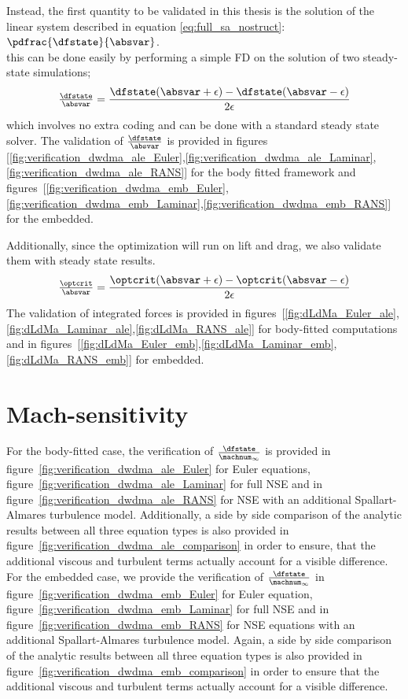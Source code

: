 \documentclass[../main.tex]{subfiles}
\begin{document}
Instead, the first quantity to be validated in this thesis is the solution of the linear system described in equation \eqref{eq:full_sa_nostruct}: $\pdfrac{\dfstate}{\absvar}$.\\
this can be done easily by performing a simple \ac{FD} on the solution of two steady-state simulations;
\begin{align}
\tfrac{\dfstate}{\absvar}=\frac{\dfstate(\absvar+\epsilon)-\dfstate(\absvar-\epsilon)}{2 \epsilon}
\end{align}
which involves no extra coding and can be done with a standard steady state solver.
The validation of $\tfrac{\dfstate}{\absvar}$ is provided in figures [\ref{fig:verification_dwdma_ale_Euler},\ref{fig:verification_dwdma_ale_Laminar},\ref{fig:verification_dwdma_ale_RANS}] for the body fitted framework and figures~[\ref{fig:verification_dwdma_emb_Euler},\ref{fig:verification_dwdma_emb_Laminar},\ref{fig:verification_dwdma_emb_RANS}] for the embedded.

Additionally, since the optimization will run on lift and drag, we also validate them with steady state results.
\begin{align}
\tfrac{\optcrit}{\absvar}=\frac{\optcrit(\absvar+\epsilon)-\optcrit(\absvar-\epsilon)}{2 \epsilon}
\end{align}
The validation of integrated forces is provided in figures~[\ref{fig:dLdMa_Euler_ale},\ref{fig:dLdMa_Laminar_ale},\ref{fig:dLdMa_RANS_ale}] for body-fitted computations and in figures~[\ref{fig:dLdMa_Euler_emb},\ref{fig:dLdMa_Laminar_emb},\ref{fig:dLdMa_RANS_emb}] for embedded.



\section{Mach-sensitivity}
For the body-fitted case, the verification of $\tfrac{\dfstate}{\machnum_{\infty}}$ is provided in figure~\ref{fig:verification_dwdma_ale_Euler} for Euler equations, figure~\ref{fig:verification_dwdma_ale_Laminar} for full \ac{NSE} and in figure~\ref{fig:verification_dwdma_ale_RANS} for \ac{NSE} with an additional Spallart-Almares turbulence model.
Additionally, a side by side comparison of the analytic results between all three equation types is also provided in figure~\ref{fig:verification_dwdma_ale_comparison} in order to ensure, that the additional viscous and turbulent terms actually account for a visible difference.\\
For the embedded case, we provide the verification of $\tfrac{\dfstate}{\machnum_{\infty}}$  in figure~\ref{fig:verification_dwdma_emb_Euler} for Euler equation, figure~\ref{fig:verification_dwdma_emb_Laminar} for full \ac{NSE} and in figure~\ref{fig:verification_dwdma_emb_RANS} for \ac{NSE} equations with an additional Spallart-Almares turbulence model.
Again, a side by side comparison of the analytic results between all three equation types is also provided in figure~\ref{fig:verification_dwdma_emb_comparison} in order to ensure that the additional viscous and turbulent terms actually account for a visible difference.
\end{document}
